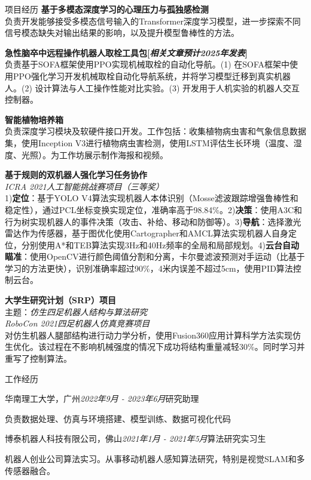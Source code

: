 \documentclass{resume} %
\begin{document}
\begin{rSection}{项目经历}
{\bf 基于多模态深度学习的心理压力与孤独感检测}
\\ 负责开发能够接受多模态信号输入的Transformer深度学习模型，进一步探索不同信号模态缺失对输出结果的影响，以及提升模型鲁棒性的方法。

{\bf 急性脑卒中远程操作机器人取栓工具包[{\em 相关文章预计2025年发表}]}
\\ 负责基于SOFA框架使用PPO实现机械取栓的自动化导航。(1) 在SOFA框架中使用PPO强化学习开发机械取栓自动化导航系统，并将学习模型迁移到真实机器人。(2) 设计算法与人工操作性能对比实验。(3) 开发用于人机实验的机器人交互控制器。

{\bf 智能植物培养箱}
\\ 负责深度学习模块及软硬件接口开发。工作包括：收集植物病虫害和气象信息数据集，使用Inception V3进行植物病虫害检测，使用LSTM评估生长环境（温度、湿度、光照）。为工作坊展示制作海报和视频。

{\bf 基于规则的双机器人强化学习任务协作}\\
{\em ICRA 2021人工智能挑战赛项目（三等奖）}\\
1){\bf 定位}：基于YOLO V4算法实现机器人本体识别（Mosse滤波跟踪增强鲁棒性和稳定性），通过PCL坐标变换实现定位，准确率高于98.84\%。2){\bf 决策}：使用A3C和行为树实现机器人的事件决策（攻击、补给、移动和防御等）。3){\bf 导航}：选择激光雷达作为传感器，基于图优化使用Cartographer和AMCL算法实现机器人自身定位，分别使用A*和TEB算法实现3Hz和40Hz频率的全局和局部规划。4){\bf 云台自动瞄准}：使用OpenCV进行颜色阈值分割和分离，卡尔曼滤波预测对手运动（比基于学习的方法更快），识别准确率超过90\%，4米内误差不超过5cm，使用PID算法控制云台。

{\bf 大学生研究计划（SRP）项目}\\
主题：{\em 仿生四足机器人结构与算法研究}\\
{\em RoboCon 2021四足机器人仿真竞赛项目}
\\ 对仿生机器人腿部结构进行动力学分析，使用Fusion360应用计算科学方法实现仿生优化。该过程在不影响机械强度的情况下成功将结构重量减轻30\%。同时学习并重写了控制算法。

\end{rSection}


\begin{rSection}{工作经历}

\begin{rSubsection}{华南理工大学，广州}{\em 2022年9月 - 2023年6月}{研究助理}{}
\item 负责数据处理、仿真与环境搭建、模型训练、数据可视化代码
\end{rSubsection}

\begin{rSubsection}{博泰机器人科技有限公司，佛山}{\em 2021年1月 - 2021年5月}{算法研究实习生}{}
\item 机器人创业公司算法实习。从事移动机器人感知算法研究，特别是视觉SLAM和多传感器融合。
\end{rSubsection}

\end{rSection}
\end{document}
